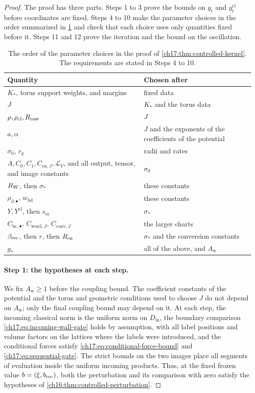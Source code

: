 \begin{proof}
The proof has three parts. Steps 1 to 3 prove the bounds on $y_t$ and $y_t^{\mathrm{cl}}$ before coordinates are fixed. Steps 4 to 10 make the parameter choices in the order summarized in \cref{ch17:tab:parameters} and check that each choice uses only quantities fixed before it. Steps 11 and 12 prove the iteration and the bound on the oscillation.

\begin{table}[t]
\centering
\small
\begin{tabular}{@{}p{}p{}@{}}
\toprule
Quantity & Chosen after\\
\midrule
$K_*$, torus support weights, and margins & fixed data\\
$J$ & $K_*$ and the torus data\\
$\rho,\rho_{\mathrm{cl}},R_{\mathrm{raw}}$ & $J$\\
$a,\alpha$ & $J$ and the exponents of the coefficients of the potential\\
$\sigma_0$, $r_q$ & radii and rates\\
$A,C_0,C_1,C_{\mathrm{en},J},\mathcal L_V$, and all output, tensor, and image constants & $\sigma_0$\\
$R_W$, then $\sigma_*$ & these constants\\
$\rho_{\partial,\bullet}$, $w_{\mathrm{bd}}$ & these constants\\
$Y,Y^{\mathrm{cl}}$, then $s_{\mathrm{er}}$ & $\sigma_*$\\
$C_{\mathrm{bc},\bullet}$, $C_{\mathrm{word},J}$, $C_{\mathrm{conv},J}$ & the larger charts\\
$\beta_{\mathrm{rec}}$, then $r$, then $R_{\mathrm{en}}$ & $\sigma_*$ and the conversion constants\\
$g_*$ & all of the above, and $A_{\mathrm w}$\\
\bottomrule
\end{tabular}
\caption{The order of the parameter choices in the proof of \cref{ch17:thm:controlled-kernel}. The requirements are stated in Steps 4 to 10.}\label{ch17:tab:parameters}
\end{table}

\paragraph{Step 1: the hypotheses at each step.}
We fix $A_{\mathrm w}\ge1$ before the coupling bound. The coefficient constants of the potential and the torus and geometric conditions used to choose $J$ do not depend on $A_{\mathrm w}$; only the final coupling bound may depend on it. At each step, the incoming classical norm is the uniform norm on $D_{\mathrm{in}}$, the boundary comparison \eqref{ch17:eq:incoming-wall-gate} holds by assumption, with all label positions and volume factors on the lattices where the labels were introduced, and the conditional forces satisfy \eqref{ch17:eq:conditional-force-bound} and \eqref{ch17:eq:sequential-gate}. The strict bounds on the two images place all segments of evaluation inside the uniform incoming products. Thus, at the fixed frozen value $b=(\xi,b_{\mathrm{rec}})$, both the perturbation and its comparison with zero satisfy the hypotheses of \cref{ch16:thm:controlled-perturbation}.


\end{proof}
